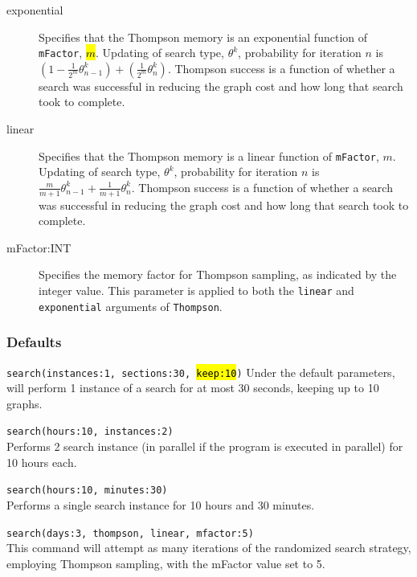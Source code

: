\begin{description}
			\begin{description}
			\item[exponential] Specifies that the Thompson memory is an exponential function of 
			\texttt{mFactor}, \hl{$m$}.  Updating of search type, $\theta^k$, probability for iteration 
			$n$ is $ \left(1 - \frac{1}{2^m} \theta^k_{n-1}\right) + \left(\frac{1}{2^m} \theta^k_n \right)$.  
			Thompson success is a function of whether a search was successful in reducing the graph 
			cost and how long that search took to complete.
			
			\item[linear] Specifies that the Thompson memory is a linear function of \texttt{mFactor}, 
			$m$.  Updating of search type, $\theta^k$, probability for iteration $n$ is $\frac{m}{m+1} 
			\theta^k_{n-1} + \frac{1}{m+1} \theta^k_n$.  Thompson success is a function of whether 
			a search was successful in reducing the graph cost and how long that search took to 
			complete.
			
			\item[mFactor:INT] Specifies the memory factor for Thompson sampling, as 
			indicated by the integer value. This parameter is applied to both the \texttt{linear}
			and \texttt{exponential} arguments of \texttt{Thompson}.
			\end{description}
	\end{description}		
	
	\subsubsection{Defaults}
		\texttt{search(instances:1, sections:30, \hl{keep:10})} Under the default parameters, 
		\phyg will perform 1 instance of a search for at most 30 seconds, keeping up to 10 graphs.
		
	\begin{example}
		\item{\texttt{search(hours:10, instances:2)}\\ Performs 2 search instance (in parallel if the 
		program is executed in parallel) for 10 hours each.}
				
		\item{\texttt{search(hours:10, minutes:30)}\\ Performs a single search instance for 10 
		hours and 30 minutes.}
		
		\item{\texttt{search(days:3, thompson, linear, mfactor:5)}\\ This command will attempt
		as many iterations of the randomized search strategy, employing Thompson sampling, 
		with the mFactor value set to 5.}
	\end{example}
	
